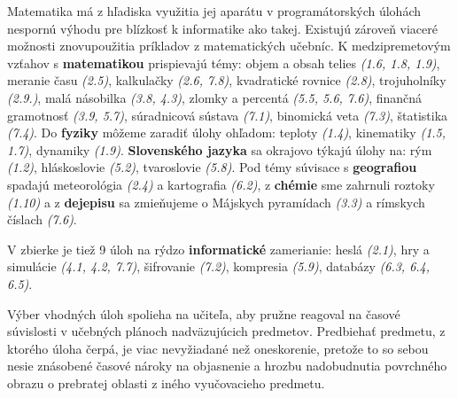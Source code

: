 Matematika má z hľadiska využitia jej aparátu v programátorských úlohách nespornú výhodu pre blízkosť k informatike ako takej. Existujú zároveň viaceré možnosti znovupoužitia príkladov z matematických učebníc. K medzipremetovým vzťahov s \textbf{matematikou} prispievajú témy:
objem a obsah telies \emph{(1.6, 1.8, 1.9)}, meranie času \emph{(2.5)}, kalkulačky \emph{(2.6, 7.8)}, kvadratické rovnice \emph{(2.8)}, trojuholníky \emph{(2.9.)}, malá násobilka \emph{(3.8, 4.3)}, zlomky a percentá \emph{(5.5, 5.6, 7.6)}, finančná gramotnosť \emph{(3.9, 5.7)}, súradnicová sústava \emph{(7.1)}, binomická veta \emph{(7.3)}, štatistika \emph{(7.4)}. Do \textbf{fyziky} môžeme zaradiť úlohy ohľadom: teploty \emph{(1.4)}, kinematiky \emph{(1.5, 1.7)}, dynamiky \emph{(1.9)}. \textbf{Slovenského jazyka} sa okrajovo týkajú úlohy na: rým \emph{(1.2)}, hláskoslovie \emph{(5.2)}, tvaroslovie \emph{(5.8)}. Pod témy súvisace s \textbf{geografiou} spadajú meteorológia \emph{(2.4)} a kartografia \emph{(6.2)}, z \textbf{chémie} sme zahrnuli roztoky \emph{(1.10)} a z \textbf{dejepisu} sa zmieňujeme o Májskych pyramídach \emph{(3.3)} a rímskych číslach \emph{(7.6)}.

V zbierke je tiež 9 úloh na rýdzo \textbf{informatické} zamerianie: heslá \emph{(2.1)}, hry a simulácie \emph{(4.1, 4.2, 7.7)}, šifrovanie \emph{(7.2)}, kompresia \emph{(5.9)}, databázy \emph{(6.3, 6.4, 6.5)}.

Výber vhodných úloh spolieha na učiteľa, aby pružne reagoval na časové súvislosti v učebných plánoch nadväzujúcich predmetov. Predbiehať predmetu, z ktorého úloha čerpá, je viac nevyžiadané než oneskorenie, pretože to so sebou nesie znásobené časové nároky na objasnenie a hrozbu nadobudnutia povrchného obrazu o prebratej oblasti z iného vyučovacieho predmetu.

